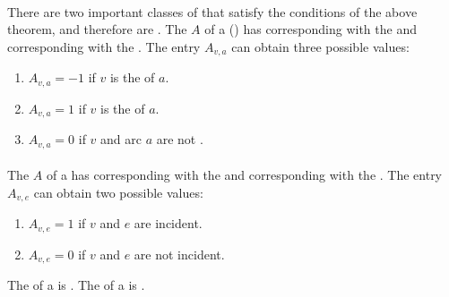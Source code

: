 \paragraph{}
There are two important classes of  that satisfy the conditions of the above theorem, and therefore are . The  $A$ of a  () has  corresponding with the  and  corresponding with the . The entry $A_{v,a}$ can obtain three possible values:
\begin{enumerate}
 \item $A_{v,a}=-1$ if  $v$ is the  of  $a$.
 \item $A_{v,a}=1$ if  $v$ is the  of  $a$.
 \item $A_{v,a}=0$ if  $v$ and arc $a$ are not .
\end{enumerate}

\paragraph{}
The  $A$ of a  has  corresponding with the  and  corresponding with the . The entry $A_{v,e}$ can obtain two possible values:
\begin{enumerate}
 \item $A_{v,e}=1$ if  $v$ and  $e$ are incident.
 \item $A_{v,e}=0$ if  $v$ and  $e$ are not incident.
\end{enumerate}

\begin{corollary}
The  of a  is . The  of a  is .
\end{corollary}


